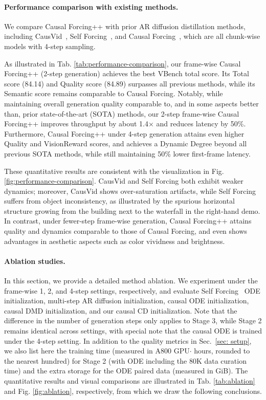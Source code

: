 \documentclass{llmxive}
\begin{document}
\paragraph{Performance comparison with existing methods.} We compare Causal Forcing++ with prior AR diffusion distillation methods, including CausVid~\cite{yin2025slow}, Self Forcing~\cite{huang2025self}, and Causal Forcing~\cite{zhu2026causal}, which are all chunk-wise models with 4-step sampling. 

As illustrated in Tab. \ref{tab:performance-comparison}, our frame-wise Causal Forcing++ (2-step generation) achieves the best VBench total score. Its Total score (84.14) and Quality score (84.89) surpasses all previous methods, while its Semantic score remains comparable to Causal Forcing. Notably, while maintaining overall generation quality comparable to, and in some aspects better than, prior state-of-the-art (SOTA) methods, our 2-step frame-wise Causal Forcing++ improves throughput by about 1.4× and reduces latency by 50\%. Furthermore, Causal Forcing++ under 4-step generation attains even higher Quality and VisionReward scores, and achieves a Dynamic Degree beyond all previous SOTA methods, while still maintaining 50\% lower first-frame latency.

These quantitative results are consistent with the visualization in Fig. \ref{fig:performance-comparison}. CausVid and Self Forcing both exhibit weaker dynamics; moreover, CausVid shows over-saturation artifacts, while Self Forcing suffers from object inconsistency, as illustrated by the spurious horizontal structure growing from the building next to the waterfall in the right-hand demo. In contrast, under fewer-step frame-wise generation, Causal Forcing++ attains quality and dynamics comparable to those of Causal Forcing, and even shows advantages in aesthetic aspects such as color vividness and brightness.


\paragraph{Ablation studies.} 
In this section, we provide a detailed method ablation. We experiment under the frame-wise 1, 2, and 4-step settings, respectively, and evaluate Self Forcing~\cite{huang2025self} ODE initialization, multi-step AR diffusion initialization, causal ODE initialization, causal DMD initialization, and our causal CD initialization. Note that the difference in the number of generation steps only applies to Stage 3, while Stage 2 remains identical across settings, with special note that the causal ODE is trained under the 4-step setting. In addition to the quality metrics in Sec.~\ref{sec: setup}, we also list here the training time (measured in A800 GPU$\cdot$ hours,  rounded to the nearest hundred) for Stage 2 (with ODE including the 80K data curation time) and the extra storage for the ODE paired data (measured in GiB). The quantitative results and visual comparisons are illustrated in Tab. \ref{tab:ablation} and Fig. \ref{fig:ablation}, respectively, from which we draw the following conclusions.
\end{document}
